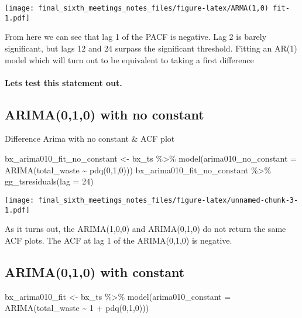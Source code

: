\documentclass[
]{article}
\newenvironment{Shaded}{\begin{snugshade}}{\end{snugshade}}
\newcommand{\AttributeTok}[1]{\textcolor[rgb]{0.77,0.63,0.00}{#1}}
\newcommand{\DecValTok}[1]{\textcolor[rgb]{0.00,0.00,0.81}{#1}}
\newcommand{\FunctionTok}[1]{\textcolor[rgb]{0.00,0.00,0.00}{#1}}
\newcommand{\NormalTok}[1]{#1}
\newcommand{\OtherTok}[1]{\textcolor[rgb]{0.56,0.35,0.01}{#1}}
\newcommand{\SpecialCharTok}[1]{\textcolor[rgb]{0.00,0.00,0.00}{#1}}
\begin{document}
\texttt{[image: final\_sixth\_meetings\_notes\_files/figure-latex/ARMA(1,0) fit-1.pdf]}

From here we can see that lag 1 of the PACF is negative. Lag 2 is barely
significant, but lags 12 and 24 surpass the significant threshold.
Fitting an AR(1) model which will turn out to be equivalent to taking a
first difference

\hypertarget{lets-test-this-statement-out.}{%
\paragraph{Lets test this statement
out.}\label{lets-test-this-statement-out.}}

\hypertarget{arima010-with-no-constant}{%
\subsection{ARIMA(0,1,0) with no
constant}\label{arima010-with-no-constant}}

Difference Arima with no constant \& ACF plot

\begin{Shaded}
\begin{Highlighting}[]
\NormalTok{bx\_arima010\_fit\_no\_constant }\OtherTok{\textless{}{-}}\NormalTok{ bx\_ts }\SpecialCharTok{\%\textgreater{}\%} \FunctionTok{model}\NormalTok{(}\AttributeTok{arima010\_no\_constant =} \FunctionTok{ARIMA}\NormalTok{(total\_waste }\SpecialCharTok{\textasciitilde{}} \FunctionTok{pdq}\NormalTok{(}\DecValTok{0}\NormalTok{,}\DecValTok{1}\NormalTok{,}\DecValTok{0}\NormalTok{)))}
\NormalTok{bx\_arima010\_fit\_no\_constant }\SpecialCharTok{\%\textgreater{}\%} \FunctionTok{gg\_tsresiduals}\NormalTok{(}\AttributeTok{lag =} \DecValTok{24}\NormalTok{)}
\end{Highlighting}
\end{Shaded}

\texttt{[image: final\_sixth\_meetings\_notes\_files/figure-latex/unnamed-chunk-3-1.pdf]}

As it turns out, the ARIMA(1,0,0) and ARIMA(0,1,0) do not return the
same ACF plots. The ACF at lag 1 of the ARIMA(0,1,0) is negative.

\hypertarget{arima010-with-constant}{%
\subsection{ARIMA(0,1,0) with constant}\label{arima010-with-constant}}

\begin{Shaded}
\begin{Highlighting}[]
\NormalTok{bx\_arima010\_fit }\OtherTok{\textless{}{-}}\NormalTok{ bx\_ts }\SpecialCharTok{\%\textgreater{}\%} \FunctionTok{model}\NormalTok{(}\AttributeTok{arima010\_constant =} \FunctionTok{ARIMA}\NormalTok{(total\_waste }\SpecialCharTok{\textasciitilde{}} \DecValTok{1} \SpecialCharTok{+} \FunctionTok{pdq}\NormalTok{(}\DecValTok{0}\NormalTok{,}\DecValTok{1}\NormalTok{,}\DecValTok{0}\NormalTok{)))}
\end{Highlighting}
\end{Shaded}
\end{document}
